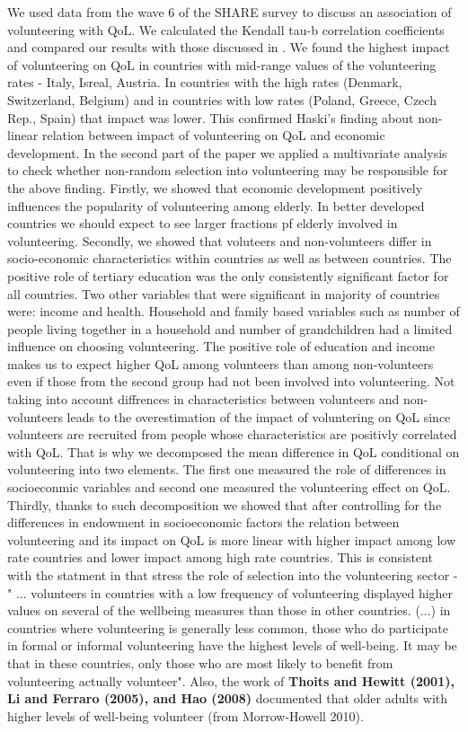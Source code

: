 \documentclass[10pt, letterpaper]{article}
\begin{document}
\begin{spacing}{1.4}
We used data from the wave 6 of the SHARE survey to discuss an association of volunteering with QoL. We calculated the Kendall tau-b correlation coefficients and compared  our results with those discussed in \citet{haski09}. We found the highest impact of volunteering on QoL in countries with mid-range values of the volunteering rates - Italy, Isreal, Austria. In countries with the high rates (Denmark, Switzerland, Belgium) and in countries with low rates (Poland, Greece, Czech Rep., Spain) that impact was lower. This confirmed Haski's finding about non-linear relation between impact of volunteering on QoL and economic development. 
In the second part of the paper we applied a multivariate analysis to check whether non-random selection into volunteering may be responsible for the above finding. Firstly, we showed that economic development positively influences the popularity of volunteering among elderly. In better developed countries we should expect to see larger fractions pf elderly involved in volunteering. Secondly, we showed that voluteers and non-volunteers differ in socio-economic characteristics within countries as well as between countries. The positive role of tertiary education was the only consistently significant factor for all countries. Two other variables that were significant in majority of countries were: income and health. Household and family based variables such as number of people living together in a household and number of grandchildren had a limited influence on choosing volunteering. The positive role of education and income makes us to expect higher QoL among volunteers than among non-volunteers even if those from the second group had not been involved into volunteering. Not taking into account diffrences in characteristics between volunteers and non-volunteers leads to the overestimation of the impact of voluntering on QoL since volunteers are recruited from people whose characteristics are positivly correlated with QoL. That is why we decomposed the mean difference in QoL conditional on volunteering into two elements. The first one measured the role of differences in socioeconmic variables and second one measured the  volunteering effect on QoL. Thirdly, thanks to such decomposition we showed that after controlling for the differences in endowment in socioeconomic factors the relation between  volunteering and its impact on QoL is more linear with higher impact among low rate countries and lower impact among high rate countries. This is consistent with the statment in \citet{plagnol10} that stress the role of selection into the volunteering sector - " ... volunteers in countries with a low frequency of volunteering displayed higher values on several of the wellbeing measures than those in other countries. (...) in countries where volunteering is generally less common, those who do participate in formal or informal volunteering have the highest levels of well-being. It may be that in these countries, only those who are most likely to benefit from volunteering actually volunteer". Also, the work of \textbf{Thoits and Hewitt (2001), Li and Ferraro (2005), and Hao (2008)} documented that older adults with higher levels of well-being volunteer (from Morrow-Howell 2010).


\end{spacing}
\end{document}
